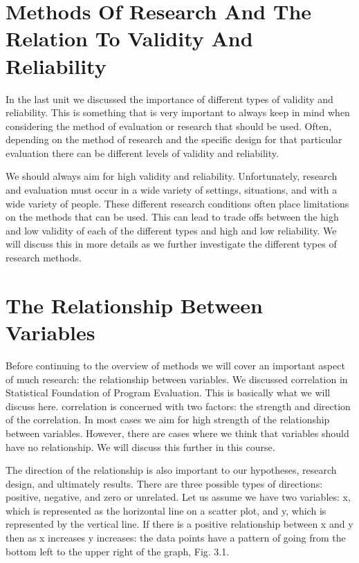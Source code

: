 \documentclass[]{book}
\theoremstyle{definition}
\theoremstyle{definition}
\theoremstyle{definition}
\theoremstyle{remark}
\begin{document}
\hypertarget{methods-of-research-and-the-relation-to-validity-and-reliability}{%
\section{Methods Of Research And The Relation To Validity And
Reliability}\label{methods-of-research-and-the-relation-to-validity-and-reliability}}

In the last unit we discussed the importance of different types of
validity and reliability. This is something that is very important to
always keep in mind when considering the method of evaluation or
research that should be used. Often, depending on the method of research
and the specific design for that particular evaluation there can be
different levels of validity and reliability.

We should always aim for high validity and reliability. Unfortunately,
research and evaluation must occur in a wide variety of settings,
situations, and with a wide variety of people. These different research
conditions often place limitations on the methods that can be used. This
can lead to trade offs between the high and low validity of each of the
different types and high and low reliability. We will discuss this in
more details as we further investigate the different types of research
methods.

\hypertarget{the-relationship-between-variables}{%
\section{The Relationship Between
Variables}\label{the-relationship-between-variables}}

Before continuing to the overview of methods we will cover an important
aspect of much research: the relationship between variables. We
discussed correlation in Statistical Foundation of Program Evaluation.
This is basically what we will discuss here. correlation is concerned
with two factors: the strength and direction of the correlation. In most
cases we aim for high strength of the relationship between variables.
However, there are cases where we think that variables should have no
relationship. We will discuss this further in this course.

The direction of the relationship is also important to our hypotheses,
research design, and ultimately results. There are three possible types
of directions: positive, negative, and zero or unrelated. Let us assume
we have two variables: x, which is represented as the horizontal line on
a scatter plot, and y, which is represented by the vertical line. If
there is a positive relationship between x and y then as x increases y
increases: the data points have a pattern of going from the bottom left
to the upper right of the graph, Fig. 3.1.
\end{document}
